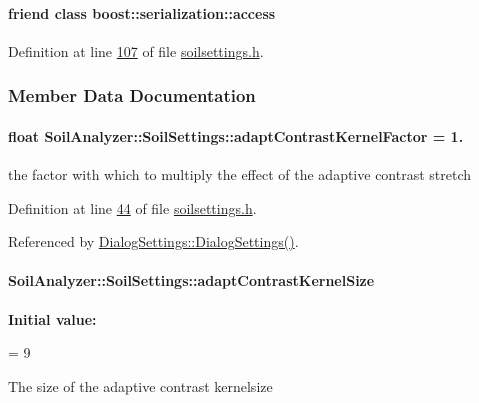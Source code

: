\paragraph[{boost\+::serialization\+::access}]{\setlength{\rightskip}{0pt plus 5cm}friend class boost\+::serialization\+::access\hspace{0.3cm}{\ttfamily [friend]}}\label{class_soil_analyzer_1_1_soil_settings_ac98d07dd8f7b70e16ccb9a01abf56b9c}


Definition at line \hyperlink{soilsettings_8h_source_l00107}{107} of file \hyperlink{soilsettings_8h_source}{soilsettings.\+h}.



\subsubsection{Member Data Documentation}
\hypertarget{class_soil_analyzer_1_1_soil_settings_ace12c0f4bc35d420ef528cc390fc2cdb}{}
\paragraph[{adapt\+Contrast\+Kernel\+Factor}]{\setlength{\rightskip}{0pt plus 5cm}float Soil\+Analyzer\+::\+Soil\+Settings\+::adapt\+Contrast\+Kernel\+Factor = 1.}\label{class_soil_analyzer_1_1_soil_settings_ace12c0f4bc35d420ef528cc390fc2cdb}
the factor with which to multiply the effect of the adaptive contrast stretch 

Definition at line \hyperlink{soilsettings_8h_source_l00044}{44} of file \hyperlink{soilsettings_8h_source}{soilsettings.\+h}.



Referenced by \hyperlink{dialogsettings_8cpp_source_l00005}{Dialog\+Settings\+::\+Dialog\+Settings()}.

\hypertarget{class_soil_analyzer_1_1_soil_settings_a73f627b092dbdbda37b66ef6c2eef95c}{}
\paragraph[{adapt\+Contrast\+Kernel\+Size}]{ Soil\+Analyzer\+::\+Soil\+Settings\+::adapt\+Contrast\+Kernel\+Size}\label{class_soil_analyzer_1_1_soil_settings_a73f627b092dbdbda37b66ef6c2eef95c}
{\bfseries Initial value\+:}
\begin{DoxyCode}
=
      9
\end{DoxyCode}
The size of the adaptive contrast kernelsize 


